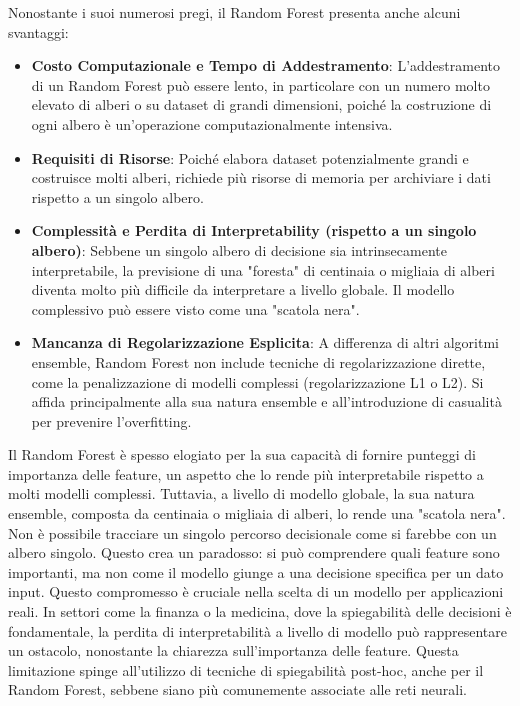 \documentclass[a4paper,12pt]{report}
\begin{document}
	Nonostante i suoi numerosi pregi, il Random Forest presenta anche alcuni svantaggi:
	\begin{itemize}
		\item \textbf{Costo Computazionale e Tempo di Addestramento}: L'addestramento di un Random Forest può essere lento, in particolare con un numero molto elevato di alberi o su dataset di grandi dimensioni, poiché la costruzione di ogni albero è un'operazione computazionalmente intensiva.
		\item \textbf{Requisiti di Risorse}: Poiché elabora dataset potenzialmente grandi e costruisce molti alberi, richiede più risorse di memoria per archiviare i dati rispetto a un singolo albero.
		\item \textbf{Complessità e Perdita di Interpretability (rispetto a un singolo albero)}: Sebbene un singolo albero di decisione sia intrinsecamente interpretabile, la previsione di una "foresta" di centinaia o migliaia di alberi diventa molto più difficile da interpretare a livello globale. Il modello complessivo può essere visto come una "scatola nera".
		\item \textbf{Mancanza di Regolarizzazione Esplicita}: A differenza di altri algoritmi ensemble, Random Forest non include tecniche di regolarizzazione dirette, come la penalizzazione di modelli complessi (regolarizzazione L1 o L2). Si affida principalmente alla sua natura ensemble e all'introduzione di casualità per prevenire l'overfitting.
	\end{itemize}
	
	Il Random Forest è spesso elogiato per la sua capacità di fornire punteggi di importanza delle feature, un aspetto che lo rende più interpretabile rispetto a molti modelli complessi. Tuttavia, a livello di modello globale, la sua natura ensemble, composta da centinaia o migliaia di alberi, lo rende una "scatola nera". Non è possibile tracciare un singolo percorso decisionale come si farebbe con un albero singolo. Questo crea un paradosso: si può comprendere quali feature sono importanti, ma non come il modello giunge a una decisione specifica per un dato input. Questo compromesso è cruciale nella scelta di un modello per applicazioni reali. In settori come la finanza o la medicina, dove la spiegabilità delle decisioni è fondamentale, la perdita di interpretabilità a livello di modello può rappresentare un ostacolo, nonostante la chiarezza sull'importanza delle feature. Questa limitazione spinge all'utilizzo di tecniche di spiegabilità post-hoc, anche per il Random Forest, sebbene siano più comunemente associate alle reti neurali.
	
\end{document}
